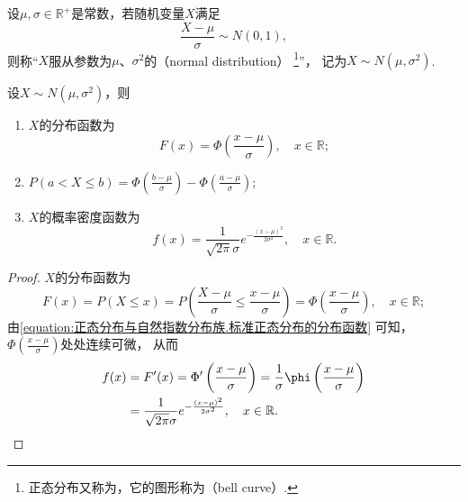 \begin{definition}\label{definition:正态分布.正态分布的定义}
设\(\mu,\sigma\in\mathbb{R}^+\)是常数，若随机变量\(X\)满足\[
	\frac{X-\mu}{\sigma} \sim N(0,1),
\]
则称“\(X\)服从参数为\(\mu\)、\(\sigma^2\)的（normal distribution）%
\footnote{%
正态分布又称为，它的图形称为（bell curve）.
}”，
记为\(X \sim N(\mu,\sigma^2)\).
\end{definition}

\begin{theorem}
设\(X \sim N(\mu,\sigma^2)\)，则
\begin{enumerate}
	\item \(X\)的分布函数为\[
		F(x) = \Phi\left(\frac{x-\mu}{\sigma}\right),
		\quad x\in\mathbb{R};
	\]
	\item \(P(a < X \leq b) = \Phi\left(\frac{b-\mu}{\sigma}\right) - \Phi\left(\frac{a-\mu}{\sigma}\right)\);
	\item \(X\)的概率密度函数为\[
		f(x) = \frac{1}{\sqrt{2 \pi} \sigma} e^{-\frac{(x-\mu)^2}{2\sigma^2}},
		\quad x\in\mathbb{R}.
	\]
\end{enumerate}
\begin{proof}
\(X\)的分布函数为\[
	F(x) = P(X \leq x)
	= P\left(\frac{X-\mu}{\sigma}\leq\frac{x-\mu}{\sigma}\right)
	= \Phi\left(\frac{x-\mu}{\sigma}\right), \quad x\in\mathbb{R};
\]
由\cref{equation:正态分布与自然指数分布族.标准正态分布的分布函数} 可知，
\(\Phi\left(\frac{x-\mu}{\sigma}\right)\)处处连续可微，
从而\begin{align*}
	f(x) &= F'(x) = \Phi'\left(\frac{x-\mu}{\sigma}\right)
	= \frac{1}{\sigma} \phi\left(\frac{x-\mu}{\sigma}\right) \\
	&= \frac{1}{\sqrt{2 \pi} \sigma} e^{-\frac{(x-\mu)^2}{2\sigma^2}},
	\quad x\in\mathbb{R}.
	\qedhere
\end{align*}
\end{proof}
\end{theorem}

